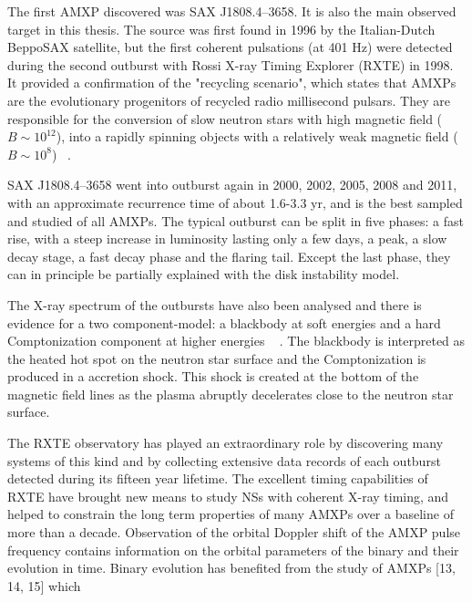 \documentclass{wihuri}
\begin{document}
The first AMXP discovered was SAX J1808.4–3658. It is also the main observed target in this thesis. The source was first found in 1996 by the Italian-Dutch BeppoSAX satellite, but the first coherent pulsations (at 401 Hz) were detected during the second outburst with Rossi X-ray Timing Explorer (RXTE) in 1998.  It provided a confirmation of the "recycling scenario", which states that AMXPs are the evolutionary progenitors of recycled radio millisecond pulsars. They are responsible for the conversion of slow neutron stars with high magnetic field ($B \sim 10^{12}$), into a rapidly spinning objects with a relatively weak magnetic field ($B \sim 10^{8}$) ~\cite{patruno}. 


SAX J1808.4–3658 went into outburst again in 2000, 2002, 2005, 2008 and 2011,
with an approximate recurrence time of about 1.6-3.3 yr, and is the best sampled and
studied of all AMXPs. The typical outburst can be split in five phases: a
fast rise, with a steep increase in luminosity lasting only a few days, a peak, a slow
decay stage, a fast decay phase and the flaring tail. Except the last phase, they can in principle be partially explained with the disk instability model. %


The X-ray spectrum of the outbursts have also been analysed and there is evidence for a two component-model: a blackbody at soft energies and a hard Comptonization component at higher energies ~\cite{twocompmod} %
. The blackbody is interpreted as the heated hot spot on the neutron star surface and the Comptonization is produced in a accretion shock. This shock is created at the bottom of the magnetic field lines as the plasma abruptly decelerates close to the neutron star surface.




\iffalse

The RXTE observatory has played an extraordinary role by discovering many
systems of this kind and by collecting extensive data records of each outburst detected
during its fifteen year lifetime. The excellent timing capabilities of RXTE
have brought new means to study NSs with coherent X-ray timing, and helped to
constrain the long term properties of many AMXPs over a baseline of more than
a decade. Observation of the orbital Doppler shift of the AMXP pulse frequency
contains information on the orbital parameters of the binary and their evolution in
time. Binary evolution has benefited from the study of AMXPs [13, 14, 15] which
\end{document}

